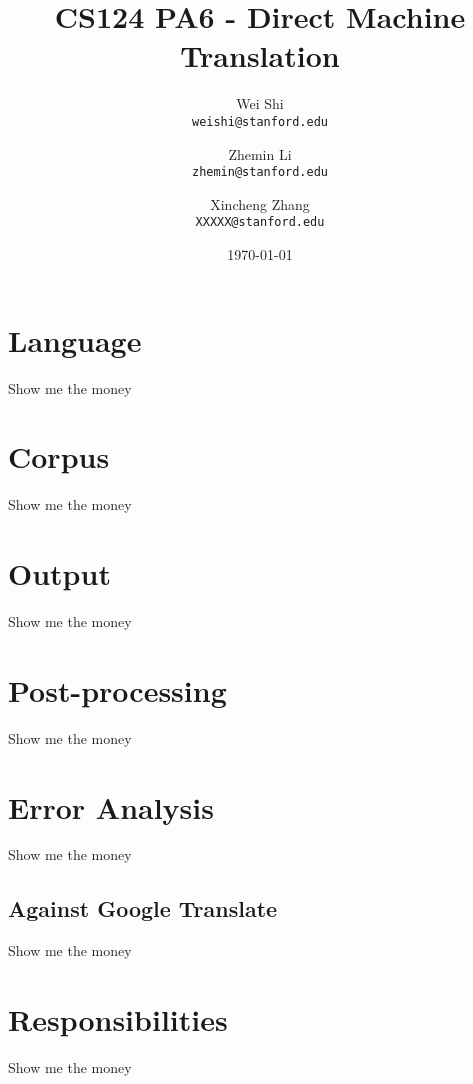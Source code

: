 \documentclass[11pt]{article} %
\author{
    Wei Shi\\
    \texttt{weishi@stanford.edu}
    \and
    Zhemin Li\\
    \texttt{zhemin@stanford.edu}
    \and
    Xincheng Zhang\\
    \texttt{XXXXX@stanford.edu}
}
\begin{document}
\title{CS124 PA6 - Direct Machine Translation}
\date{\today}
\maketitle

\section{Language}
Show me the money

\section{Corpus}
Show me the money

\section{Output}
Show me the money

\section{Post-processing}
Show me the money

\section{Error Analysis}
Show me the money

\subsection{Against Google Translate}
Show me the money

\section{Responsibilities}
Show me the money
\end{document}
